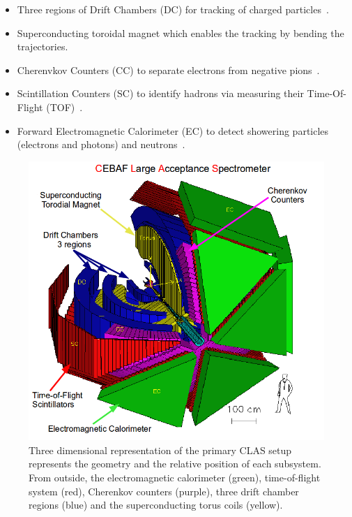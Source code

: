 \documentclass[aps,prl,twocolumn,showpacs,superscriptaddress,groupedaddress]{revtex4}
\begin{document}
\begin{itemize}
 \item Three regions of Drift Chambers (DC) for tracking of charged 
    particles~\cite{DCref}.
 \item Superconducting toroidal magnet which enables the tracking by bending 
    the trajectories.
 \item Cherenvkov Counters (CC) to separate electrons from negative 
    pions~\cite{CCref}.
 \item Scintillation Counters (SC) to identify hadrons via measuring their 
    Time-Of-Flight (TOF)~\cite{TOFref}.
 \item Forward Electromagnetic Calorimeter (EC) to detect showering particles 
    (electrons and photons) and neutrons~\cite{ECref}.
\end{itemize}

\begin{figure}[tbp]
\centering \includegraphics[scale=0.3]{fig/test_clas.png}
\caption{Three dimensional representation of the primary CLAS setup represents 
   the geometry and the relative position of each subsystem. From outside, the 
electromagnetic calorimeter (green), time-of-flight system (red), Cherenkov 
counters (purple), three drift chamber regions (blue) and the superconducting 
torus coils (yellow).} 
\label{fig:CLAS}
\end{figure}
\end{document}
